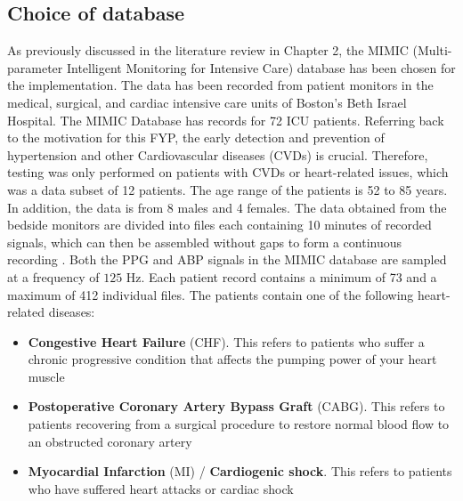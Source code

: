 \subsection{Choice of database}
As previously discussed in the literature review in Chapter 2, the 
MIMIC (Multi-parameter Intelligent Monitoring for Intensive Care) database has been chosen 
for the implementation. The data has been recorded from patient monitors in the medical, 
surgical, and cardiac intensive care units of Boston's Beth Israel Hospital. The MIMIC Database 
has records for 72 ICU patients. Referring back to the motivation for this FYP, the early detection and prevention of hypertension and other Cardiovascular diseases (CVDs) is 
crucial. Therefore, testing was only performed on patients with CVDs or heart-related issues, which was a data subset of 12 patients. The age range of the patients 
is 52 to 85 years. In addition, the data is from 8 males and 4 females. The data obtained from the bedside monitors are divided into files 
each containing 10 minutes of recorded signals, which can then be assembled without 
gaps to form a continuous recording \cite{Moody1996}. Both the PPG and ABP signals in the MIMIC database 
are sampled at a frequency of $125$ Hz. Each patient record contains a minimum of 73 and a maximum of 412 individual files.
 The patients contain one of the following heart-related diseases:
\begin{itemize}
    \item \textbf{Congestive Heart Failure} (CHF). This refers to patients who suffer a chronic progressive condition that affects the pumping power of your heart muscle \cite{chf}
    \item \textbf{Postoperative Coronary Artery Bypass Graft} (CABG). This refers to patients recovering from a surgical procedure to restore normal blood flow to an obstructed coronary artery \cite{cabg}
    \item \textbf{Myocardial Infarction} (MI) / \textbf{Cardiogenic shock}. This refers to patients who have suffered heart attacks or cardiac shock \cite{mi}
\end{itemize}


